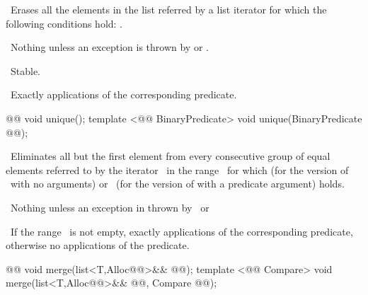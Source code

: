 \documentclass[american,twoside]{book}
\begin{document}
\begin{itemdescr}
\pnum
\effects\ 
Erases all the elements in the list referred by a list iterator
for which the following conditions hold:
.

\pnum
\throws\ 
Nothing unless an exception is thrown by
or
.

\pnum
\notes\ 
Stable.

\pnum
\complexity\ 
Exactly
applications of the corresponding predicate.
\end{itemdescr}

%
\begin{itemdecl}
@@ void unique();
template <@@ BinaryPredicate> void unique(BinaryPredicate @@);
\end{itemdecl}

\begin{itemdescr}
\pnum
\effects\ 
Eliminates all but the first element from every
consecutive group of equal elements referred to by the
iterator
\
in the range
\
for which
(for the version of
\
with no arguments) or
\
(for the version of
with a predicate argument)
holds.

\pnum
\throws\ 
Nothing unless an exception in thrown by
\tcode{*i == *(i-1)}\
or
\tcode{\farg{pred}(*i, *(i - 1))}\

\pnum
\complexity\ 
If the range
\tcode{[\farg{first}, \farg{last})}\
is not empty, exactly
applications of the corresponding predicate,
otherwise no applications of the predicate.
\end{itemdescr}

%
\begin{itemdecl}
@@ void merge(list<T,Alloc@@>&& @@);
template <@@ Compare> 
  void merge(list<T,Alloc@@>&& @@, Compare @@);
\end{itemdecl}
\end{document}
